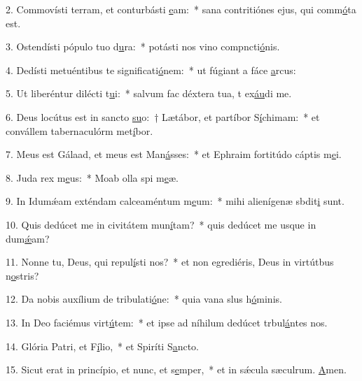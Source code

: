 2. Commovísti terram, et conturbásti \uline{e}am:~* sana contritiónes ejus, qui comm\uline{ó}ta est.\par 
3. Ostendísti pópulo tuo d\uline{u}ra:~* potásti nos vino compncti\uline{ó}nis.\par 
4. Dedísti metuéntibus te significati\uline{ó}nem:~* ut fúgiant a fáce \uline{a}rcus:\par 
5. Ut liberéntur dilécti t\uline{u}i:~* salvum fac déxtera tua, t ex\uline{áu}di me.\par 
6. Deus locútus est in sancto \uline{su}o:~† Lætábor, et partíbor S\uline{í}chimam:~* et convállem tabernaculórm met\uline{í}bor.\par 
7. Meus est Gálaad, et meus est Man\uline{á}sses:~* et Ephraim fortitúdo cáptis m\uline{e}i.\par 
8. Juda rex m\uline{e}us:~* Moab olla spi m\uline{e}æ.\par 
9. In Idumǽam exténdam calceaméntum m\uline{e}um:~* mihi alienígenæ sbdit\uline{i} sunt.\par 
10. Quis dedúcet me in civitátem mun\uline{í}tam?~* quis dedúcet me usque in dum\uline{ǽ}am?\par 
11. Nonne tu, Deus, qui repul\uline{í}sti nos?~* et non egrediéris, Deus in virtútbus n\uline{o}stris?\par 
12. Da nobis auxílium de tribulati\uline{ó}ne:~* quia vana slus h\uline{ó}minis.\par 
13. In Deo faciémus virt\uline{ú}tem:~* et ipse ad níhilum dedúcet trbul\uline{á}ntes nos.\par 
14. Glória Patri, et F\uline{í}lio,~* et Spiríti S\uline{a}ncto.\par 
15. Sicut erat in princípio, et nunc, et s\uline{e}mper,~* et in sǽcula sæculrum. \uline{A}men.\par 
